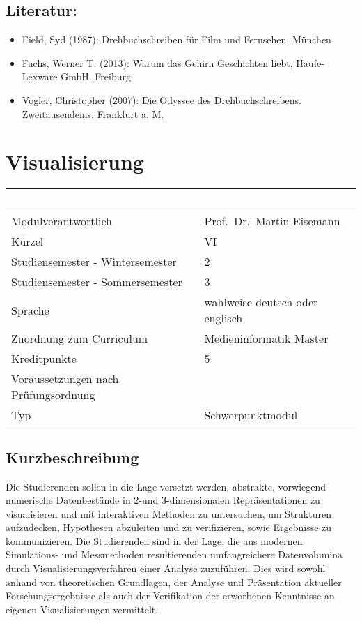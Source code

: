 \section*{Literatur:}\label{literatur-20}

\begin{itemize}
\item
  Field, Syd (1987): Drehbuchschreiben für Film und Fernsehen, München
\item
  Fuchs, Werner T. (2013): Warum das Gehirn Geschichten liebt,
  Haufe-Lexware GmbH. Freiburg
\item
  Vogler, Christopher (2007): Die Odyssee des Drehbuchschreibens.
  Zweitausendeins. Frankfurt a. M.
\end{itemize}

\chapter{Visualisierung}\label{visualisierung}

\begin{longtable}[]{@{}ll@{}}
\toprule
~ & ~\tabularnewline
\midrule
\endhead
Modulverantwortlich & Prof.~Dr.~Martin Eisemann\tabularnewline
Kürzel & VI\tabularnewline
Studiensemester - Wintersemester & 2\tabularnewline
Studiensemester - Sommersemester & 3\tabularnewline
Sprache & wahlweise deutsch oder englisch\tabularnewline
Zuordnung zum Curriculum & Medieninformatik Master\tabularnewline
Kreditpunkte & 5\tabularnewline
Voraussetzungen nach Prüfungsordnung & ~\tabularnewline
Typ & Schwerpunktmodul\tabularnewline
\bottomrule
\end{longtable}

\section*{Kurzbeschreibung}\label{kurzbeschreibung-15}

Die Studierenden sollen in die Lage versetzt werden, abstrakte,
vorwiegend numerische Datenbestände in 2-und 3-dimensionalen
Repräsentationen zu visualisieren und mit interaktiven Methoden zu
untersuchen, um Strukturen aufzudecken, Hypothesen abzuleiten und zu
verifizieren, sowie Ergebnisse zu kommunizieren. Die Studierenden sind
in der Lage, die aus modernen Simulations- und Messmethoden
resultierenden umfangreichere Datenvolumina durch
Visualisierungsverfahren einer Analyse zuzuführen. Dies wird sowohl
anhand von theoretischen Grundlagen, der Analyse und Präsentation
aktueller Forschungsergebnisse als auch der Verifikation der erworbenen
Kenntnisse an eigenen Visualisierungen vermittelt.

